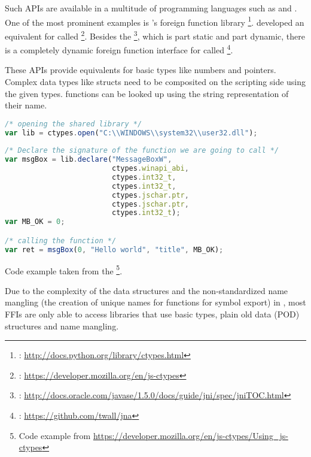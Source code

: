 Such APIs are available in a multitude of programming languages such as  and . One of the most prominent examples is 's foreign function library \footnote{: \url{http://docs.python.org/library/ctypes.html}}.  developed an equivalent for  called \footnote{: \url{https://developer.mozilla.org/en/js-ctypes}}. Besides the \footnote{: \url{http://docs.oracle.com/javase/1.5.0/docs/guide/jni/spec/jniTOC.html}}, which is part static and part dynamic, there is a completely dynamic foreign function interface for  called \footnote{: \url{https://github.com/twall/jna}}.

These APIs provide equivalents for basic  types like numbers and pointers. Complex data types like structs need to be composited on the scripting side using the given types.  functions can be looked up using the string representation of their name.

\SingleSpacing
\begin{lstlisting}[language=JavaScript, caption={Exposing a \myProperName{C} function to \myProperName{JavaScript} using \myProperName{js-ctypes}}]
/* opening the shared library */
var lib = ctypes.open("C:\\WINDOWS\\system32\\user32.dll");  
  
/* Declare the signature of the function we are going to call */  
var msgBox = lib.declare("MessageBoxW",  
                         ctypes.winapi_abi,  
                         ctypes.int32_t,  
                         ctypes.int32_t,  
                         ctypes.jschar.ptr,  
                         ctypes.jschar.ptr,  
                         ctypes.int32_t);  
var MB_OK = 0;  

/* calling the function */
var ret = msgBox(0, "Hello world", "title", MB_OK); 
\end{lstlisting}
\OnehalfSpacing

Code example taken from the \footnote{Code example from \url{https://developer.mozilla.org/en/js-ctypes/Using_js-ctypes}}.

Due to the complexity of the data structures and the non-standardized name mangling (the creation of unique names for functions for symbol export) in , most FFIs are only able to access libraries that use basic  types, plain old data (POD) structures and  name mangling.

